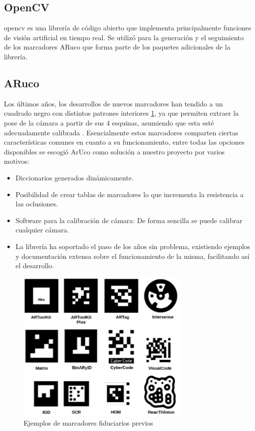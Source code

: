\subsection{OpenCV}
\acrfull{opencv} es una librería de código abierto que implementa principalmente funciones de visión artificial en tiempo real. Se utilizó para la generación y el seguimiento de los marcadores ARuco que forma parte de los paquetes adicionales de la librería.
\subsection{ARuco}
Los últimos años, los desarrollos de nuevos marcadores han tendido a un cuadrado negro con distintos patrones interiores \ref{fig:qrtags}, ya que permiten extraer la pose de la cámara a partir de sus 4 esquinas, asumiendo que esta esté adecuadamente calibrada \cite{GarridoJurado2014}. Esencialmente estos marcadores comparten ciertas características comunes en cuanto a su funcionamiento, entre todas las opciones disponibles se escogió ArUco como solución a nuestro proyecto por varios motivos:
\begin{itemize}
    \item Diccionarios generados dinámicamente.
    \item Posibilidad de crear tablas de marcadores lo que incrementa la resistencia a las oclusiones.
    \item Software para la calibración de cámara: De forma sencilla se puede calibrar cualquier cámara.
    \item La librería ha soportado el paso de los años sin problema, existiendo ejemplos y documentación extensa sobre el funcionamiento de la misma, facilitando así el desarrollo.
\end{itemize}


\begin{figure}[hp!]
  \centering
  \includegraphics[width=0.75\textwidth]{imaxes/qrtags.png}
  \caption{Ejemplos de marcadores fiduciarios previos}
  \label{fig:qrtags}
\end{figure}

